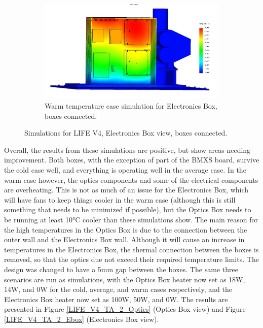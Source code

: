 \begin{figure}
    \begin{subfigure}[h]{0.65\textwidth}
        \centering
        \includegraphics[width=\textwidth]{chap3_images/LIFE_V4_images/TA_Full_Model_Iter_3_ebox.JPG}
        \caption{Warm temperature case simulation for Electronics Box, boxes connected.}
        \label{fig:LIFE_V4_TA_Ebox_1c}
    \end{subfigure}
    \caption{Simulations for LIFE V4, Electronics Box view, boxes connected.}
    \label{LIFE_V4_TA_1_Ebox}
\end{figure}

Overall, the results from these simulations are positive, but show areas needing improvement. Both boxes, with the exception of part of the BMXS board, survive the cold case well, and everything is operating well in the average case. In the warm case however, the optics components and some of the electrical components are overheating. This is not as much of an issue for the Electronics Box, which will have fans to keep things cooler in the warm case (although this is still something that needs to be minimized if possible), but the Optics Box needs to be running at least 10°C cooler than these simulations show. The main reason for the high temperatures in the Optics Box is due to the connection between the outer wall and the Electronics Box wall. Although it will cause an increase in temperatures in the Electronics Box, the thermal connection between the boxes is removed, so that the optics due not exceed their required temperature limits. The design was changed to have a 5mm gap between the boxes. The same three scenarios are run as simulations, with the Optics Box heater now set as 18W, 14W, and 0W for the cold, average, and warm cases respectively, and the Electronics Box heater now set as 100W, 50W, and 0W. The results are presented in Figure \ref{LIFE_V4_TA_2_Optics} (Optics Box view) and Figure \ref{LIFE_V4_TA_2_Ebox} (Electronics Box view).

